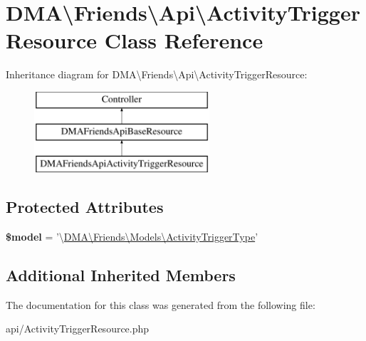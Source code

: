 \hypertarget{classDMA_1_1Friends_1_1Api_1_1ActivityTriggerResource}{\section{D\-M\-A\textbackslash{}Friends\textbackslash{}Api\textbackslash{}Activity\-Trigger\-Resource Class Reference}
\label{classDMA_1_1Friends_1_1Api_1_1ActivityTriggerResource}
}
Inheritance diagram for D\-M\-A\textbackslash{}Friends\textbackslash{}Api\textbackslash{}Activity\-Trigger\-Resource\-:\begin{figure}[H]
\begin{center}
\leavevmode
\includegraphics[height=3.000000cm]{dc/d89/classDMA_1_1Friends_1_1Api_1_1ActivityTriggerResource}
\end{center}
\end{figure}
\subsection*{Protected Attributes}
\begin{DoxyCompactItemize}
\item 
\hypertarget{classDMA_1_1Friends_1_1Api_1_1ActivityTriggerResource_ada7f5693b6e5dc676fe24187b48a4e7a}{{\bfseries \$model} = '\textbackslash{}\hyperlink{classDMA_1_1Friends_1_1Models_1_1ActivityTriggerType}{D\-M\-A\textbackslash{}\-Friends\textbackslash{}\-Models\textbackslash{}\-Activity\-Trigger\-Type}'}\label{classDMA_1_1Friends_1_1Api_1_1ActivityTriggerResource_ada7f5693b6e5dc676fe24187b48a4e7a}

\end{DoxyCompactItemize}
\subsection*{Additional Inherited Members}


The documentation for this class was generated from the following file\-:\begin{DoxyCompactItemize}
\item 
api/Activity\-Trigger\-Resource.\-php\end{DoxyCompactItemize}
